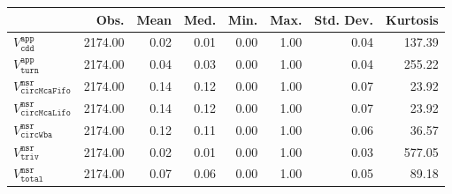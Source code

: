 \begin{tabular}{lrrrrrrr}
  \hline
 & Obs. & Mean & Med. & Min. & Max. & Std. Dev. & Kurtosis \\ 
  \hline
$V^{\mathtt{app}}_{\mathtt{cdd}}$ & 2174.00 & 0.02 & 0.01 & 0.00 & 1.00 & 0.04 & 137.39 \\ 
  $V^{\mathtt{app}}_{\mathtt{turn}}$ & 2174.00 & 0.04 & 0.03 & 0.00 & 1.00 & 0.04 & 255.22 \\ 
  $V^{\mathtt{msr}}_{\mathtt{circMcaFifo}}$ & 2174.00 & 0.14 & 0.12 & 0.00 & 1.00 & 0.07 & 23.92 \\ 
  $V^{\mathtt{msr}}_{\mathtt{circMcaLifo}}$ & 2174.00 & 0.14 & 0.12 & 0.00 & 1.00 & 0.07 & 23.92 \\ 
  $V^{\mathtt{msr}}_{\mathtt{circWba}}$ & 2174.00 & 0.12 & 0.11 & 0.00 & 1.00 & 0.06 & 36.57 \\ 
  $V^{\mathtt{msr}}_{\mathtt{triv}}$ & 2174.00 & 0.02 & 0.01 & 0.00 & 1.00 & 0.03 & 577.05 \\ 
  $V^{\mathtt{msr}}_{\mathtt{total}}$ & 2174.00 & 0.07 & 0.06 & 0.00 & 1.00 & 0.05 & 89.18 \\ 
   \hline
\end{tabular}
